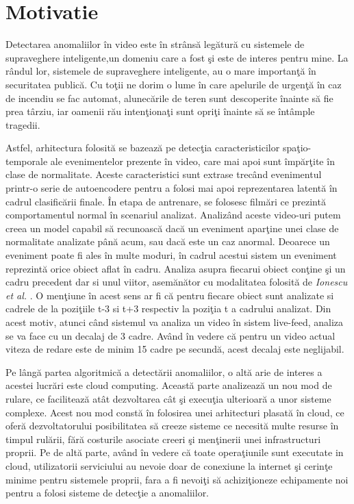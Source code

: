 \documentclass[a4paper,12pt]{report}
\begin{document}
\section{Motivatie}
\quad Detectarea anomaliilor în video este în strânsă legătură cu sistemele de supraveghere inteligente,un domeniu care a fost şi este de interes pentru mine. La rândul lor, sistemele de supraveghere inteligente, au o mare importanţă în securitatea publică. Cu toţii ne dorim o lume în care apelurile de urgenţă în caz de incendiu se fac automat, alunecările de teren sunt descoperite înainte să fie prea târziu, iar oamenii rău intenţionaţi sunt opriţi înainte să se întâmple tragedii. 
\par
Astfel, arhitectura folosită se bazează pe detecţia caracteristicilor spaţio-temporale ale evenimentelor prezente în video, care mai apoi sunt împărţite în clase de normalitate. Aceste caracteristici sunt extrase trecând evenimentul printr-o serie de autoencodere pentru a folosi mai apoi reprezentarea latentă în cadrul clasificării finale. În etapa de antrenare, se folosesc filmări ce prezintă comportamentul normal în scenariul analizat. Analizând aceste video-uri putem creea un model capabil să recunoască dacă un eveniment aparţine unei clase de normalitate analizate până acum, sau dacă este un caz anormal. Deoarece un eveniment poate fi ales în multe moduri, în cadrul acestui sistem un eveniment reprezintă orice obiect aflat în cadru. Analiza asupra fiecarui obiect conţine şi un cadru precedent dar si unul viitor, asemănător cu modalitatea folosită de \emph{Ionescu et al.}  \cite{ionescu2019object}. O menţiune în acest sens ar fi că  pentru fiecare obiect sunt analizate si cadrele de la poziţiile t-3 si t+3  respectiv la poziţia t a cadrului analizat. Din acest motiv, atunci când sistemul va analiza un video în sistem live-feed, analiza se va face cu un decalaj de 3 cadre. Având în vedere că pentru un video actual viteza de redare este de minim 15 cadre pe secundă, acest decalaj este neglijabil.
\par
Pe lângă partea algoritmică a detectării anomaliilor, o altă arie de interes a acestei lucrări este cloud computing. Această parte analizează un nou mod de rulare, ce facilitează atât dezvoltarea cât şi execuţia ulterioară a unor sisteme complexe. Acest nou mod constă în folosirea unei arhitecturi plasată în cloud, ce oferă dezvoltatorului posibilitatea să creeze sisteme ce necesită multe resurse în timpul rulării, fără costurile asociate creeri şi menţinerii unei infrastructuri proprii. Pe de altă parte, având în vedere că toate operaţiunile sunt executate in cloud, utilizatorii serviciului au nevoie doar de conexiune la internet şi cerinţe minime pentru sistemele proprii, fara a fi nevoiţi să achiziţioneze echipamente noi pentru a folosi sisteme de detecţie a anomaliilor.
\end{document}
